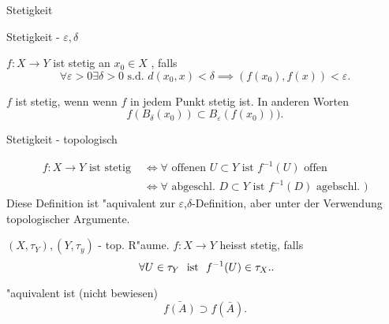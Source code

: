 \documentclass[class=article, crop=false]{standalone}
\begin{document}
\begin{zettel}{Stetigkeit}
\begin{flashcard}

\begin{question}
    Stetigkeit - $\varepsilon, \delta $ 
\end{question}

\begin{definition}[Stetigkeit]
    $f:X \longrightarrow Y$ ist stetig an $x_0 \in  X$ , falls
\[
    \forall \varepsilon >  0 \exists  \delta  > 0 \text{ s.d. }  d (x_0 , x) < \delta \implies (f (x_0), f (x)) <  \varepsilon
.\]

    $f$ ist stetig, wenn wenn $f$ in jedem Punkt stetig ist.
    In anderen Worten
\[
    f (B_{\delta }(x_0)) \subset B_{\varepsilon } (f (x_0)) )
.\]
\end{definition}
\end{flashcard}
\begin{question}
    Stetigkeit - topologisch
\end{question}
\begin{definition}[Stetigkeit]
\begin{align*}
    f:X \longrightarrow Y \text{ ist stetig }  &\iff \forall \text{ offenen } U \subset Y \text{ ist } f^{-1} (U) \text{ offen } \\
                                               &\iff \forall  \text{ abgeschl. } D \subset Y \text{ ist } f^{-1} (D) \text{ agebschl. } )
\end{align*}
    Diese Definition ist "aquivalent zur $\varepsilon $,$\delta$-Definition, aber unter der Verwendung topologischer Argumente.
\end{definition}

\begin{definition}[Stetigkeit]
   $(X, \tau_Y), (Y, \tau_y)$  - top. R"aume. $f:X \longrightarrow Y$ heisst stetig, falls
   \[
       \forall U \in  \tau_Y \tx{ ist } f^{-1} (U) \in  \tau_X.
   .\]
\end{definition}

"aquivalent ist (nicht bewiesen)
\[
    \bar{f(A)} \supset f (\bar{A}) 
.\]

\end{zettel}
\end{document}
